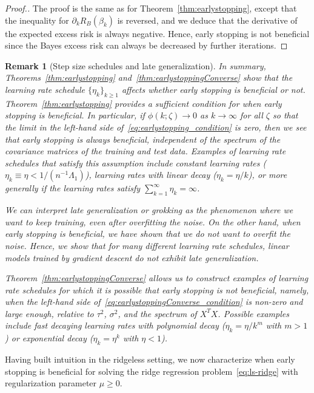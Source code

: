\documentclass[11pt]{article}
\newtheorem{remark}{Remark}
\begin{document}
\begin{proof}[Proof.]
The proof is the same as for Theorem~\ref{thm:earlystopping}, except that the inequality for $\partial_k R_B(\beta_k)$ is reversed, and we deduce that the derivative of the expected excess risk is always negative. Hence, early stopping is not beneficial since the Bayes excess risk can always be decreased by further iterations.
\end{proof}

\begin{remark}[Step size schedules and late generalization] \label{rem:grokking}
In summary, Theorems~\ref{thm:earlystopping} and~\ref{thm:earlystoppingConverse} show that the learning rate schedule $\{ \eta_k \}_{k \geq 1}$ affects whether early stopping is beneficial or not.
Theorem~\ref{thm:earlystopping} provides a sufficient condition for when early stopping is beneficial. In particular, if $\phi(k; \zeta) \to 0$ as $k \to \infty$ for all $\zeta$ so that the limit in the left-hand side of~\eqref{eq:earlystopping_condition} is zero, then we see that early stopping is \emph{always beneficial}, \emph{independent of the spectrum of the covariance matrices of the training and test data.} 
Examples of learning rate schedules that satisfy this assumption include constant learning rates ($\eta_k \equiv \eta < 1/(n^{-1} \Lambda_1)$), learning rates with linear decay ($\eta_k = \eta/k$), or more generally if the learning rates satisfy $\sum_{k = 1}^\infty \eta_k = \infty$.

We can interpret \emph{late generalization} or \emph{grokking} as the phenomenon where we want to keep training, even after overfitting the noise. On the other hand, when early stopping is beneficial, we have shown that we do not want to overfit the noise. Hence, we show that for many different learning rate schedules, linear models trained by gradient descent do not exhibit late generalization.

Theorem~\ref{thm:earlystoppingConverse} allows us to construct examples of learning rate schedules for which it is possible that early stopping \emph{is not beneficial}, namely, when the left-hand side of~\eqref{eq:earlystoppingConverse_condition} is non-zero and large enough, relative to $\tau^2$, $\sigma^2$, and the spectrum of $X^T X$.
Possible examples include fast decaying learning rates with polynomial decay ($\eta_k = \eta/k^m$ with $m > 1$) or exponential decay ($\eta_k = \eta^k$ with $\eta < 1$).
\end{remark}

Having built intuition in the ridgeless setting, we now characterize when early stopping is beneficial for solving the ridge regression problem~\eqref{eq:ls-ridge} with regularization parameter $\mu \geq 0$.
\end{document}
